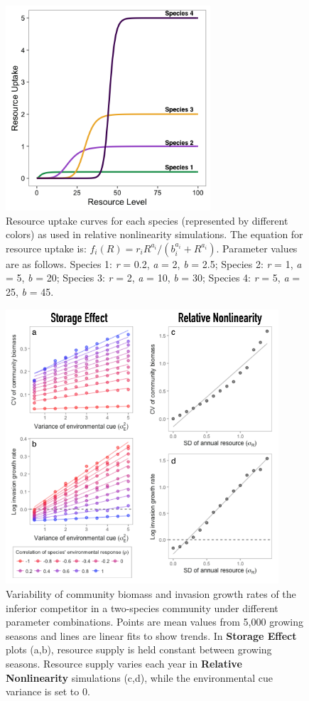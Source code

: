 \documentclass[11pt,]{article}
\begin{document}
\begin{figure}[!ht]
  \centering
      \includegraphics[width=3in]{./components/fourspp_Ruptake_relnonlin.png}
  \caption{Resource uptake curves for each species (represented by different colors) as used in relative nonlinearity simulations. The equation for resource uptake is: $f_{i}(R) = r_{i}R^{a_{i}} / (b_{i}^{a_{i}}+R^{a_{i}})$. Parameter values are as follows. Species 1: \emph{r} = 0.2, \emph{a} = 2, \emph{b} = 2.5; Species 2: \emph{r} = 1, \emph{a} = 5, \emph{b} = 20; Species 3: \emph{r} = 2, \emph{a} = 10, \emph{b} = 30; Species 4: \emph{r} = 5, \emph{a} = 25, \emph{b} = 45.}
\end{figure}

\newpage{}

\begin{figure}[!ht]
  \centering
      \includegraphics[width=4in]{./components/SI_invasion_factorials.png}
  \caption{Variability of community biomass and invasion growth rates of the inferior competitor in a two-species community under different parameter combinations. Points are mean values from 5,000 growing seasons and lines are linear fits to show trends. In \textbf{Storage Effect} plots (a,b), resource supply is held constant between growing seasons. Resource supply varies each year in \textbf{Relative Nonlinearity} simulations (c,d), while the environmental cue variance is set to 0.}
\end{figure}
\end{document}
